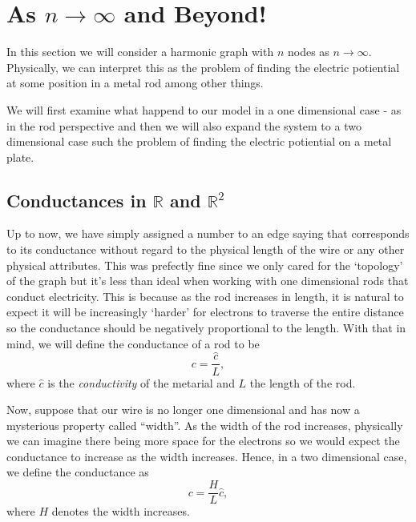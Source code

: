 \documentclass[]{article}
\begin{document}
\newpage

\section{\texorpdfstring{As \(n \to \infty\) and
Beyond!}{As n \textbackslash{}to \textbackslash{}infty and Beyond!}}\label{as-n-to-infty-and-beyond}

In this section we will consider a harmonic graph with \(n\) nodes as
\(n \to \infty\). Physically, we can interpret this as the problem of
finding the electric potiential at some position in a metal rod among
other things.

We will first examine what happend to our model in a one dimensional
case - as in the rod perspective and then we will also expand the system
to a two dimensional case such the problem of finding the electric
potiential on a metal plate.

\subsection{\texorpdfstring{Conductances in \(\mathbb{R}\) and
\(\mathbb{R}^2\)}{Conductances in \textbackslash{}mathbb\{R\} and \textbackslash{}mathbb\{R\}\^{}2}}\label{conductances-in-mathbbr-and-mathbbr2}

Up to now, we have simply assigned a number to an edge saying that
corresponds to its conductance without regard to the physical length of
the wire or any other physical attributes. This was prefectly fine since
we only cared for the `topology' of the graph but it's less than ideal
when working with one dimensional rods that conduct electricity. This is
because as the rod increases in length, it is natural to expect it will
be increasingly `harder' for electrons to traverse the entire distance
so the conductance should be negatively proportional to the length. With
that in mind, we will define the conductance of a rod to be \[
c = \frac{\hat{c}}{L},
\] where \(\hat{c}\) is the \emph{conductivity} of the metarial and
\(L\) the length of the rod.

Now, suppose that our wire is no longer one dimensional and has now a
mysterious property called ``width''. As the width of the rod increases,
physically we can imagine there being more space for the electrons so we
would expect the conductance to increase as the width increases. Hence,
in a two dimensional case, we define the conductance as
\[c = \frac{H}{L}\hat{c},\] where \(H\) denotes the width increases.
\end{document}
